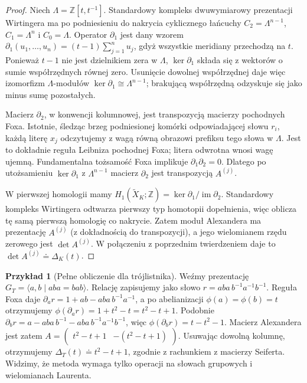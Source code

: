 \documentclass[11pt,a4paper]{report}
\numberwithin{equation}{section}
\theoremstyle{plain}
\theoremstyle{definition}
\newtheorem{przyklad}[twierdzenie]{Przykład}
\theoremstyle{remark}
\begin{document}
\begin{proof}
Niech $\Lambda=\mathbb Z[t,t^{-1}]$.
Standardowy kompleks dwuwymiarowy prezentacji Wirtingera
ma po podniesieniu do nakrycia cyklicznego łańcuchy
$C_2=\Lambda^{n-1}$, $C_1=\Lambda^n$ i $C_0=\Lambda$.
Operator $\partial_1$ jest dany wzorem
$\partial_1(u_1,\dots,u_n)=(t-1)\sum_{j=1}^n u_j$,
gdyż wszystkie meridiany przechodzą na $t$.
Ponieważ $t-1$ nie jest dzielnikiem zera w $\Lambda$,
$\ker\partial_1$ składa się z wektorów o sumie współrzędnych
równej zero. Usunięcie dowolnej współrzędnej daje więc
izomorfizm $\Lambda$-modułów
$\ker\partial_1\cong\Lambda^{n-1}$; brakującą współrzędną
odzyskuje się jako minus sumę pozostałych.

Macierz $\partial_2$, w konwencji kolumnowej, jest
transpozycją macierzy pochodnych Foxa. Istotnie, śledząc
brzeg podniesionej komórki odpowiadającej słowu
$r_i$, każdą literę $x_j$ odczytujemy z wagą równą obrazowi
prefiksu tego słowa w $\Lambda$. Jest to dokładnie reguła
Leibniza pochodnej Foxa; litera odwrotna wnosi wagę ujemną.
Fundamentalna tożsamość Foxa implikuje
$\partial_1\partial_2=0$. Dlatego po utożsamieniu
$\ker\partial_1$ z $\Lambda^{n-1}$ macierz
$\partial_2$ jest transpozycją $A^{(j)}$.

W pierwszej homologii mamy
$H_1(\widetilde X_K;\mathbb Z)=\ker\partial_1/
\operatorname{im}\partial_2$. Standardowy kompleks
Wirtingera odtwarza pierwszy typ homotopii dopełnienia,
więc oblicza tę samą pierwszą homologię co nakrycie.
Zatem moduł Alexandera ma prezentację $A^{(j)}$
(z dokładnością do transpozycji), a jego wielomianem
rzędu zerowego jest $\det A^{(j)}$. W połączeniu z
poprzednim twierdzeniem daje to
$\det A^{(j)}\doteq\Delta_K(t)$.
\end{proof}

\begin{przyklad}[Pełne obliczenie dla trójlistnika]
Weźmy prezentację
$G_T=\langle a,b\mid aba=bab\rangle$.
Relację zapisujemy jako słowo
$r=aba\,b^{-1}a^{-1}b^{-1}$.
Reguła Foxa daje
$\partial_a r=1+ab-aba\,b^{-1}a^{-1}$,
a po abelianizacji $\phi(a)=\phi(b)=t$ otrzymujemy
$\phi(\partial_a r)=1+t^2-t=t^2-t+1$.
Podobnie
$\partial_b r=a-aba\,b^{-1}-aba\,b^{-1}a^{-1}b^{-1}$,
więc $\phi(\partial_b r)=t-t^2-1$.
Macierz Alexandera jest zatem
$A=\begin{pmatrix}t^2-t+1&-(t^2-t+1)\end{pmatrix}$.
Usuwając dowolną kolumnę, otrzymujemy
$\Delta_T(t)\doteq t^2-t+1$, zgodnie z rachunkiem
z macierzy Seiferta. Widzimy, że metoda wymaga tylko
operacji na słowach grupowych i wielomianach Laurenta.
\end{przyklad}
\end{document}
